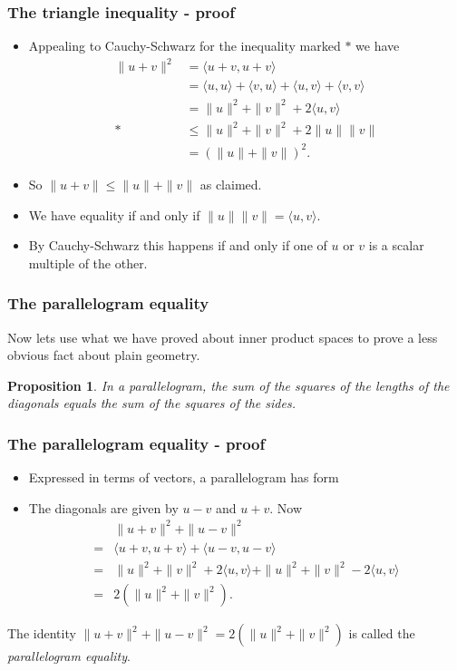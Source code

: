 \documentclass[handout]{beamer}
\newtheorem{proposition}[theorem]{Proposition}
\begin{document}
\begin{frame}
\frametitle{The triangle inequality - proof}
\begin{itemize}
\item Appealing to Cauchy-Schwarz for the inequality marked $*$ we have
\begin{align*}
\|u+v\|^2 &= \langle u+v, u+v \rangle \\
&= \langle u,u \rangle + \langle v,u \rangle + \langle u,v \rangle + \langle v,v \rangle\\
&= \|u\|^2 + \|v\|^2 + 2\langle u, v \rangle\\
*&\leq \|u\|^2 + \|v\|^2 + 2\|u\|\|v\| \\
&= (\|u\|+ \|v\|)^2.
\end{align*}
\item So $\|u+v\|\leq \|u\|+ \|v\|$ as claimed.
\item We have equality if and only if $\|u\|\|v\|= \langle u, v \rangle$. 
\item By Cauchy-Schwarz this happens if and only if one of $u$ or $v$ is a scalar multiple of the other.
\end{itemize}
\end{frame}

\begin{frame}
\frametitle{The parallelogram equality}
Now lets use what we have proved about inner product spaces to prove a less obvious fact about plain geometry.
\vspace{1cm}
\begin{proposition}
In a parallelogram, the sum of the squares of the lengths of the diagonals equals the sum of the squares of the sides.
\end{proposition}
\end{frame}

\begin{frame}
\frametitle{The parallelogram equality - proof}
\begin{itemize}
\item Expressed in terms of vectors, a parallelogram has form
\center {}
\item The diagonals are given by $u-v$ and $u+v$. Now
\begin{align*}
&\|u+v\|^2 + \|u-v\|^2\\ 
=& \langle u+v, u+v \rangle + \langle u-v, u-v \rangle\\
=& \|u\|^2 + \|v\|^2 + 2\langle u, v \rangle +\|u\|^2 + \|v\|^2 -  2\langle u,v \rangle\\
=& 2(\|u\|^2 + \|v\|^2).
\end{align*}
\end{itemize} 
The identity $\|u+v\|^2 + \|u-v\|^2 = 2(\|u\|^2 + \|v\|^2)$
is called the \emph{parallelogram equality}. 
\end{frame}
\end{document}
